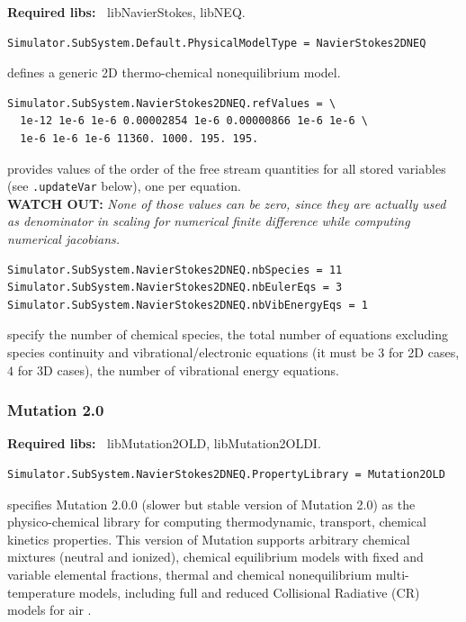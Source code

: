 \documentclass[11pt]{article}
\begin{document}
{\bf Required libs:~} libNavierStokes, libNEQ.

\begin{lstlisting}[breaklines]
Simulator.SubSystem.Default.PhysicalModelType = NavierStokes2DNEQ
\end{lstlisting}
defines a generic 2D thermo-chemical nonequilibrium model.

\begin{lstlisting}[breaklines]
Simulator.SubSystem.NavierStokes2DNEQ.refValues = \
  1e-12 1e-6 1e-6 0.00002854 1e-6 0.00000866 1e-6 1e-6 \
  1e-6 1e-6 1e-6 11360. 1000. 195. 195.
\end{lstlisting}
provides values of the order of the free stream quantities for all stored variables (see {\tt .updateVar} below), one per equation. \\
{\bf WATCH OUT:} {\it None of those values can be zero, since they are actually used 
  as denominator in scaling for numerical finite difference while computing numerical jacobians. } 

\begin{lstlisting}[breaklines]
Simulator.SubSystem.NavierStokes2DNEQ.nbSpecies = 11
Simulator.SubSystem.NavierStokes2DNEQ.nbEulerEqs = 3
Simulator.SubSystem.NavierStokes2DNEQ.nbVibEnergyEqs = 1
\end{lstlisting}
specify the number of chemical species, the total number of equations excluding species continuity and vibrational/electronic equations 
(it must be $3$ for 2D cases, $4$ for 3D cases), the number of vibrational energy equations.

\subsubsection{Mutation 2.0}

{\bf Required libs:~} libMutation2OLD, libMutation2OLDI.

\begin{lstlisting}[breaklines]
Simulator.SubSystem.NavierStokes2DNEQ.PropertyLibrary = Mutation2OLD
\end{lstlisting}
specifies Mutation 2.0.0 (slower but stable version of Mutation 2.0) \cite{phd:magin, phd:panesi} as 
the physico-chemical library for computing thermodynamic, transport, chemical kinetics properties. This version of 
Mutation supports arbitrary chemical mixtures (neutral and ionized), chemical equilibrium models 
with fixed and variable elemental fractions, thermal and chemical nonequilibrium multi-temperature models, 
including full and reduced Collisional Radiative (CR) models for air \cite{panesi09}. 
\end{document}
